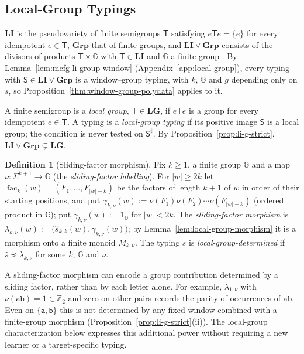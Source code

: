 \documentclass[11pt]{article}
\numberwithin{equation}{section}
\theoremstyle{plain}
\theoremstyle{definition}
\newtheorem{definition}[theorem]{Definition}
\theoremstyle{remark}
\theoremstyle{plain}
\begin{document}
\subsection{Local-Group Typings}
\label{subsec:algebraic-typed-data}

$\mathbf{LI}$ is the pseudovariety of finite semigroups $\mathsf T$ satisfying
$e\mathsf Te=\{e\}$ for every idempotent $e\in \mathsf T$, $\mathbf{Grp}$ that of finite
groups, and $\mathbf{LI}\vee\mathbf{Grp}$ consists of the divisors of
products $\mathsf T\times {\mathbb G}$ with $\mathsf T\in\mathbf{LI}$ and ${\mathbb G}$ a finite group \cite{Costa2002LI,Costa2002LIG}.
By Lemma~\ref{lem:mcfg-li-group-window} (Appendix~\ref{app:local-group}), every typing
with $\mathsf S\in\mathbf{LI}\vee\mathbf{Grp}$ is a window--group typing, with $k$, ${\mathbb G}$
and $g$ depending only on $s$, so Proposition~\ref{thm:window-group-polydata} applies to it.

A finite semigroup is a \emph{local group}, $\mathsf T\in\mathbf{LG}$, if $e\mathsf Te$ is a
group for every idempotent $e\in\mathsf T$.  A typing is a \emph{local-group typing} if
its positive image $\mathsf S$ is a local group; the condition is never tested on
$\mathsf S^\sharp$.  By
Proposition~\ref{prop:li-g-strict}, $\mathbf{LI}\vee\mathbf{Grp}\subsetneq\mathbf{LG}$.

\begin{definition}[Sliding-factor morphism]
\label{def:local-group-typing}
Fix $k\ge1$, a finite group ${\mathbb G}$ and a map $\nu:\Sigma^{k+1}\to {\mathbb G}$ (the
\emph{sliding-factor labelling}).  For $|w|\ge2k$ let
$\operatorname{fac}_k(w)=(F_1,\ldots,F_{|w|-k})$ be the factors of length $k+1$ of $w$ in
order of their starting positions, and put
$\gamma_{k,\nu}(w):=\nu(F_1)\nu(F_2)\cdots\nu(F_{|w|-k})$ (ordered product in
${\mathbb G}$); put $\gamma_{k,\nu}(w):=1_{\mathbb G}$ for $|w|<2k$.  The \emph{sliding-factor
morphism} is $\lambda_{k,\nu}(w):=\bigl(\widehat s_{k,k}(w),\gamma_{k,\nu}(w)\bigr)$; by
Lemma~\ref{lem:local-group-morphism} it is a morphism onto a finite monoid
$M_{k,\nu}$.  The typing $s$ is \emph{local-group-determined} if
$\widehat s\preceq\lambda_{k,\nu}$ for some $k$, ${\mathbb G}$ and $\nu$.
\end{definition}

A sliding-factor morphism can encode a group contribution determined by a
sliding factor, rather than by each letter alone.  For example,
$\lambda_{1,\nu}$ with $\nu(\mathtt{ab})=1\in\mathbb Z_2$ and zero on
other pairs records the parity of occurrences of $\mathtt{ab}$.
Even on $\{\mathtt a,\mathtt b\}$ this is not determined by any
fixed window combined with a finite-group morphism
(Proposition~\ref{prop:li-g-strict}(ii)).  The local-group
characterization below expresses this additional power without
requiring a new learner or a target-specific typing.
\end{document}
